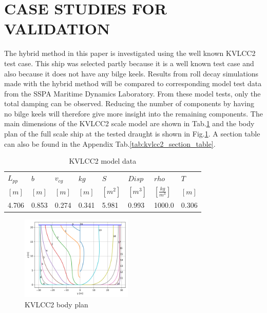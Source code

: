 \section*{CASE STUDIES FOR VALIDATION}\label{case-studies-for-validation}
\label{se:validation}
The hybrid method in this paper is investigated using the well known
KVLCC2 test case. This ship was selected partly because it is a well
known test case and also because it does not have any bilge keels.
Results from roll decay simulations made with the hybrid method will be
compared to corresponding model test data from the SSPA Maritime
Dynamics Laboratory. From these model tests, only the total damping can
be observed. Reducing the number of components by having no bilge keels
will therefore give more insight into the remaining components. The main
dimensions of the KVLCC2 scale model are shown in
Tab.\ref{tab:kvlcc2_model_data} and the body plan of the full
scale ship at the tested draught is shown in
Fig.\ref{fig:body_plan}. A section table can also be found in
the Appendix Tab.\ref{tab:kvlcc2_section_table}.
\begin{table}[H]
\scriptsize
\center
\caption{KVLCC2 model data}
\label{tab:kvlcc2_model_data}
\begin{tabular}{|l|l|l|l|l|l|l|l|}
\hline\addlinespace
$L_{pp}$ & $b$ & $v_{cg}$ & $kg$ & $S$ & $Disp$ & $rho$ & $T$\\
$[m]$ & $[m]$ & $[m]$ & $[m]$ & $[m^2]$ & $[m^3]$ & $\left[\frac{kg}{m^3}\right]$ & $[m]$\\
\hline4.706 & 0.853 & 0.274 & 0.341 & 5.981 & 0.993 & 1000.0 & 0.306\\
\hline
\end{tabular}
\end{table}
\begin{figure}[H]
\begin{center}\includegraphics[width = 0.475\textwidth]{figures/body_plan.png}\end{center}
\vspace{-0.7cm}
\caption{KVLCC2 body plan}
\label{fig:body_plan}
\end{figure}
